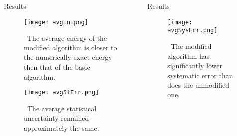 \documentclass[final]{beamer}
\newlength{\onecolwid}
\newlength{\twocolwid}
\begin{document}
\begin{frame}[t]
\begin{columns}[t]
\begin{column}{\twocolwid}



\begin{columns}[t,totalwidth=\twocolwid] %

\begin{column}{\onecolwid} %


\begin{block}{Results}
\begin{figure}
\texttt{[image: avgEn.png]}
\caption{\ The average energy of the modified algorithm is closer to the numerically exact energy then that of the basic algorithm.}
\end{figure}

\begin{figure}
\texttt{[image: avgStErr.png]}
\caption{\ The average statistical uncertainty remained approximately the same.}
\end{figure}

\end{block}


\end{column} %

\begin{column}{\onecolwid} %


\begin{block}{Results}

\begin{figure}
\texttt{[image: avgSysErr.png]}
\caption{\ The modified algorithm has significantly lower systematic error than does the unmodified one.}
\end{figure}


\end{block}
\end{column}
\end{columns}
\end{column}
\end{columns}
\end{frame}
\end{document}
